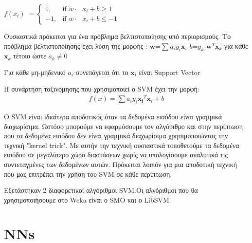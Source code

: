  $f(x_i)$ 
$ = \begin{cases} 1, & \mbox{if } w\cdot\mbox{ $x_i +b \geq 1 $} \\ -1, & \mbox{if } w\cdot\mbox{ $x_i +b \leq -1 $} \end{cases} $


 Ουσιαστικά πρόκειται για ένα πρόβλημα βελτιστοποίησης υπό περιορισμούς.
 Το πρόβλημα βελτιστοποίησης έχει λύση της μορφής :
\newline $\boldsymbol  w $=$\sum a_i y_i \boldsymbol x_i $ $b$=$y_k$-$\boldsymbol w^T \boldsymbol x_k$ για κάθε $\boldsymbol x_k$ τέτοιο ώστε $a_k\not= 0$
 
 Για κάθε μη-μηδενικό $a_i$ συνεπάγεται ότι το $\boldsymbol x_i$ είναι Support Vector
 
 Η συνάρτηση ταξινόμησης που χρησιμοποιεί ο SVM έχει την μορφή:
\begin{align*} 
f(x)=\sum a_i y_i \boldsymbol {x_i}^T \boldsymbol x_i +b
\end{align*}

Ο SVM είναι ιδιαίτερα αποδοτικός όταν τα δεδομένα εισόδου είναι γραμμικά διαχωρίσιμα. Ωστόσο μπορούμε να εφαρμόσουμε τον αλγόριθμο και στην περίπτωση που τα δεδομένα εισόδου δεν είναι γραμμικά διαχωρίσιμα χρησιμοποιώντας την τεχνική "kernel trick". Με αυτήν την τεχνική ουσιαστικά τοποθετούμε τα δεδομένα εισόδου σε μεγαλύτερο χώρο διαστάσεων χωρίς να υπολογίσουμε αναλυτικά τις συντεταγμένες των δεδομένων αυτών. Πρόκειται λοιπόν για μια αποδοτική τεχνική που μας επιτρέπει την χρήση του SVM σε κάθε περίπτωση.

Εξετάστηκαν 2 διαφορετικοί αλγόριθμοι SVM.Οι αλγόριθμοι που θα χρησιμοποιήσουμε στο Weka είναι ο SMO και ο LibSVM.





 
\section{NNs}
